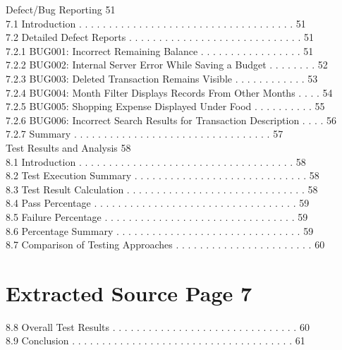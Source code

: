 \documentclass[12pt,a4paper]{report}
\begin{document}
 Defect/Bug Reporting                                                                       51\\ 
7.1 Introduction . . . . . . . . . . . . . . . . . . . . . . . . . . . . . . . . . . . .   51\\ 
7.2 Detailed Defect Reports . . . . . . . . . . . . . . . . . . . . . . . . . . . . .      51\\ 
7.2.1 BUG001: Incorrect Remaining Balance . . . . . . . . . . . . . . . . .            51\\ 
7.2.2 BUG002: Internal Server Error While Saving a Budget . . . . . . . .              52\\ 
7.2.3 BUG003: Deleted Transaction Remains Visible . . . . . . . . . . . .              53\\ 
7.2.4 BUG004: Month Filter Displays Records From Other Months . . . .                  54\\ 
7.2.5 BUG005: Shopping Expense Displayed Under Food . . . . . . . . . .                55\\ 
7.2.6 BUG006: Incorrect Search Results for Transaction Description . . . .             56\\ 
7.2.7 Summary . . . . . . . . . . . . . . . . . . . . . . . . . . . . . . . . .        57\\ 

 Test Results and Analysis                                                                  58\\ 
8.1 Introduction . . . . . . . . . . . . . . . . . . . . . . . . . . . . . . . . . . . .   58\\ 
8.2 Test Execution Summary . . . . . . . . . . . . . . . . . . . . . . . . . . . . .       58\\ 
8.3 Test Result Calculation . . . . . . . . . . . . . . . . . . . . . . . . . . . . . .    58\\ 
8.4 Pass Percentage . . . . . . . . . . . . . . . . . . . . . . . . . . . . . . . . . .    59\\ 
8.5 Failure Percentage . . . . . . . . . . . . . . . . . . . . . . . . . . . . . . . .     59\\ 
8.6 Percentage Summary . . . . . . . . . . . . . . . . . . . . . . . . . . . . . . .       59\\ 
8.7 Comparison of Testing Approaches . . . . . . . . . . . . . . . . . . . . . . .         60\\ 

\clearpage
\section*{Extracted Source Page 7}
8.8   Overall Test Results . . . . . . . . . . . . . . . . . . . . . . . . . . . . . . .     60\\ 
8.9   Conclusion . . . . . . . . . . . . . . . . . . . . . . . . . . . . . . . . . . . . .   61\\ 
\end{document}
